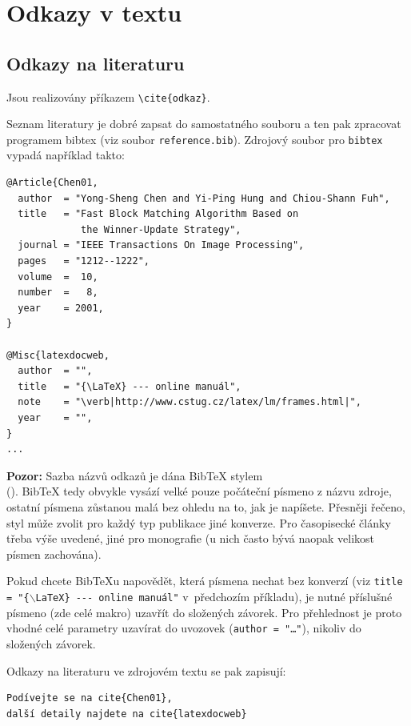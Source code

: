 \documentclass[11pt,twoside,a4paper]{book}
\begin{document}
\section{Odkazy v textu}
\subsection{Odkazy na literaturu}
Jsou realizovány příkazem \verb|\cite{odkaz}|. 

Seznam literatury je dobré zapsat do samostatného souboru a ten pak zpracovat programem bibtex (viz soubor \verb|reference.bib|). Zdrojový soubor pro \verb|bibtex| vypadá například takto:
\begin{verbatim}
@Article{Chen01,
  author  = "Yong-Sheng Chen and Yi-Ping Hung and Chiou-Shann Fuh",
  title   = "Fast Block Matching Algorithm Based on 
             the Winner-Update Strategy",
  journal = "IEEE Transactions On Image Processing",
  pages   = "1212--1222",
  volume  =  10,
  number  =   8,
  year    = 2001,
}

@Misc{latexdocweb,
  author  = "",
  title   = "{\LaTeX} --- online manuál",
  note    = "\verb|http://www.cstug.cz/latex/lm/frames.html|",
  year    = "",
}
...
\end{verbatim}

\textbf{Pozor:} Sazba názvů odkazů je dána Bib\TeX{} stylem\\ (\verb||). 
Bib\TeX{} tedy obvykle vysází velké pouze počáteční písmeno z názvu zdroje, 
ostatní písmena zůstanou malá bez ohledu na to, jak je napíšete. 
Přesněji řečeno, styl může zvolit pro každý typ publikace jiné konverze. 
Pro časopisecké články třeba výše uvedené, jiné pro monografie (u nich často bývá 
naopak velikost písmen zachována).

Pokud chcete Bib\TeX u napovědět, která písmena nechat bez konverzí 
(viz \texttt{title = "\{$\backslash$LaTeX\} -{}-{}- online manuál"} 
v~předchozím příkladu), je nutné příslušné písmeno (zde celé makro) uzavřít 
do složených závorek. Pro přehlednost je proto vhodné celé parametry 
uzavírat do uvozovek (\texttt{author = "\dots"}), nikoliv do složených závorek.

Odkazy na literaturu ve zdrojovém textu se pak zapisují:
\begin{verbatim}
Podívejte se na cite{Chen01}, 
další detaily najdete na cite{latexdocweb}
\end{verbatim}
\end{document}
